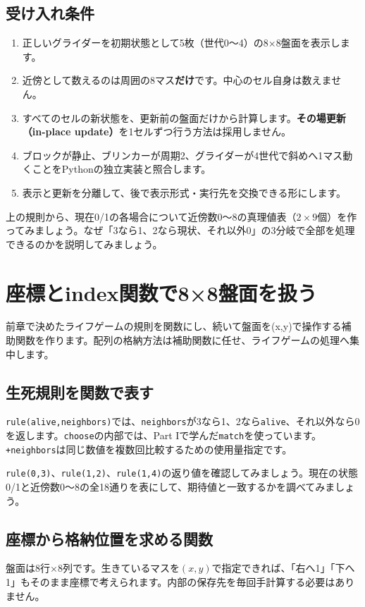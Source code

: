 \documentclass[11pt,a4paper,openany]{book}
\newcommand{\code}[1]{\texttt{#1}}
\newcommand{\term}[1]{\textbf{#1}}
\newcommand{\readcode}[2]{}
\newcommand{\exercise}[1]{\begin{exercisebox}#1\end{exercisebox}}
\begin{document}
\section{受け入れ条件}
\begin{enumerate}
\item 正しいグライダーを初期状態として5枚（世代0～4）の8×8盤面を表示します。
\item 近傍として数えるのは周囲の8マス\textbf{だけ}です。中心のセル自身は数えません。
\item すべてのセルの新状態を、更新前の盤面だけから計算します。\term{その場更新（in-place update）}を1セルずつ行う方法は採用しません。
\item ブロックが静止、ブリンカーが周期2、グライダーが4世代で斜めへ1マス動くことをPythonの独立実装と照合します。
\item 表示と更新を分離して、後で表示形式・実行先を交換できる形にします。
\end{enumerate}
\exercise{上の規則から、現在0/1の各場合について近傍数0～8の真理値表（\(2\times9\)個）を作ってみましょう。なぜ「3なら1、2なら現状、それ以外0」の3分岐で全部を処理できるのかを説明してみましょう。}

\chapter{座標とindex関数で8×8盤面を扱う}
\begin{tcolorbox}[colback=blue!3,colframe=blue!16,boxrule=.35pt,arc=1mm,left=3mm,right=3mm,top=2mm,bottom=2mm]
\small 前章で決めたライフゲームの規則を関数にし、続いて盤面を(x,y)で操作する補助関数を作ります。配列の格納方法は補助関数に任せ、ライフゲームの処理へ集中します。
\end{tcolorbox}

\section{生死規則を関数で表す}

\readcode{03_rule.bend}{ライフゲームの生死規則（03\_rule.bend）}
\code{rule(alive,neighbors)}では、\code{neighbors}が3なら1、2なら\code{alive}、それ以外なら0を返します。\code{choose}の内部では、Part Iで学んだ\code{match}を使っています。\code{+neighbors}は同じ数値を複数回比較するための使用量指定です。
\exercise{\code{rule(0,3)}、\code{rule(1,2)}、\code{rule(1,4)}の返り値を確認してみましょう。現在の状態0/1と近傍数0～8の全18通りを表にして、期待値と一致するかを調べてみましょう。}

\section{座標から格納位置を求める関数}
盤面は8行×8列です。生きているマスを\((x,y)\)で指定できれば、「右へ1」「下へ1」もそのまま座標で考えられます。内部の保存先を毎回手計算する必要はありません。
\end{document}
